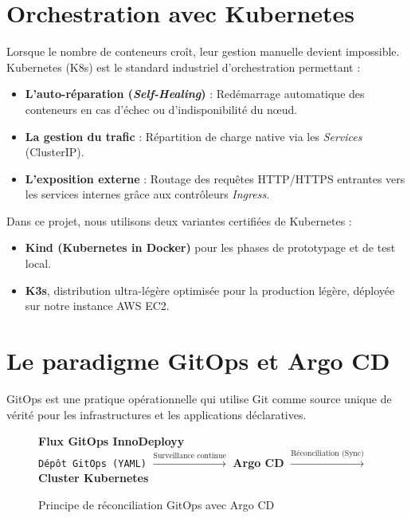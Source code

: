 \documentclass[12pt,a4paper,oneside]{report}
\begin{document}
\section{Orchestration avec Kubernetes}
Lorsque le nombre de conteneurs croît, leur gestion manuelle devient impossible. Kubernetes (K8s) est le standard industriel d'orchestration permettant :
\begin{itemize}[label=$\bullet$]
    \item \textbf{L'auto-réparation (\textit{Self-Healing})} : Redémarrage automatique des conteneurs en cas d'échec ou d'indisponibilité du nœud.
    \item \textbf{La gestion du trafic} : Répartition de charge native via les \textit{Services} (ClusterIP).
    \item \textbf{L'exposition externe} : Routage des requêtes HTTP/HTTPS entrantes vers les services internes grâce aux contrôleurs \textit{Ingress}.
\end{itemize}

Dans ce projet, nous utilisons deux variantes certifiées de Kubernetes :
\begin{itemize}
    \item \textbf{Kind (Kubernetes in Docker)} pour les phases de prototypage et de test local.
    \item \textbf{K3s}, distribution ultra-légère optimisée pour la production légère, déployée sur notre instance AWS EC2.
\end{itemize}

\section{Le paradigme GitOps et Argo CD}
GitOps est une pratique opérationnelle qui utilise Git comme source unique de vérité pour les infrastructures et les applications déclaratives. 

\begin{figure}[H]
    \centering
    \begin{tcolorbox}[colback=white,colframe=primary,arc=2mm,width=0.9\textwidth]
    \centering
    \textbf{Flux GitOps InnoDeployy} \\[0.2cm]
    \small \texttt{Dépôt GitOps (YAML)} $\xrightarrow{\text{Surveillance continue}}$ \textbf{Argo CD} $\xrightarrow{\text{Réconciliation (Sync)}}$ \textbf{Cluster Kubernetes}
    \end{tcolorbox}
    \caption{Principe de réconciliation GitOps avec Argo CD}
\end{figure}
\end{document}
